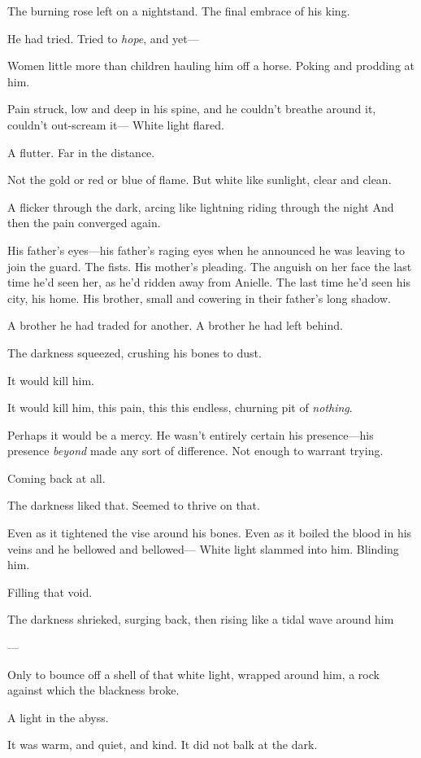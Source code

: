 The burning rose left on a nightstand. The final embrace of his king.

He had tried. Tried to \emph{hope}, and yet---

Women little more than children hauling him off a horse. Poking and prodding at him.

Pain struck, low and deep in his spine, and he couldn't breathe around it, couldn't out-scream it--- White light flared.

A flutter. Far in the distance.

Not the gold or red or blue of flame. But white like sunlight, clear and clean.

A flicker through the dark, arcing like lightning riding through the night  And then the pain converged again.

His father's eyes---his father's raging eyes when he announced he was leaving to join the guard. The fists. His mother's pleading. The anguish on her face the last time he'd seen her, as he'd ridden away from Anielle. The last time he'd seen his city, his home. His brother, small and cowering in their father's long shadow.

A brother he had traded for another. A brother he had left behind.

The darkness squeezed, crushing his bones to dust.

It would kill him.

It would kill him, this pain, this  this endless, churning pit of \emph{nothing}.

Perhaps it would be a mercy. He wasn't entirely certain his presence---his presence \emph{beyond} made any sort of difference. Not enough to warrant trying.

Coming back at all.

The darkness liked that. Seemed to thrive on that.

Even as it tightened the vise around his bones. Even as it boiled the blood in his veins and he bellowed and bellowed--- White light slammed into him. Blinding him.

Filling that void.

The darkness shrieked, surging back, then rising like a tidal wave around him

---

Only to bounce off a shell of that white light, wrapped around him, a rock against which the blackness broke.

A light in the abyss.

It was warm, and quiet, and kind. It did not balk at the dark.


